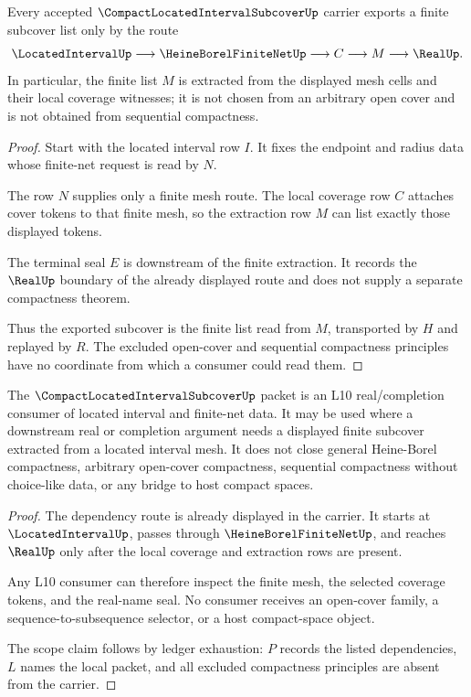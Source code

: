 \begin{theorem}
\label{thm:compact-located-interval-subcover-finite-net-extraction}
Every accepted $\CompactLocatedIntervalSubcoverUp$ carrier exports a finite subcover list only by the route
$$
\LocatedIntervalUp \longrightarrow \HeineBorelFiniteNetUp \longrightarrow C \longrightarrow M \longrightarrow \RealUp .
$$
In particular, the finite list $M$ is extracted from the displayed mesh cells and their local coverage witnesses; it is not chosen from an arbitrary open cover and is not obtained from sequential compactness.
\end{theorem}
\begin{proof}
Start with the located interval row $I$. It fixes the endpoint and radius data whose finite-net request is read by $N$.

The row $N$ supplies only a finite mesh route. The local coverage row $C$ attaches cover tokens to that finite mesh, so the extraction row $M$ can list exactly those displayed tokens.

The terminal seal $E$ is downstream of the finite extraction. It records the $\RealUp$ boundary of the already displayed route and does not supply a separate compactness theorem.

Thus the exported subcover is the finite list read from $M$, transported by $H$ and replayed by $R$. The excluded open-cover and sequential compactness principles have no coordinate from which a consumer could read them.
\end{proof}

\begin{theorem}
\label{thm:compact-located-interval-subcover-l10-scope}
The $\CompactLocatedIntervalSubcoverUp$ packet is an L10 real/completion consumer of located interval and finite-net data. It may be used where a downstream real or completion argument needs a displayed finite subcover extracted from a located interval mesh. It does not close general Heine-Borel compactness, arbitrary open-cover compactness, sequential compactness without choice-like data, or any bridge to host compact spaces.
\end{theorem}
\begin{proof}
The dependency route is already displayed in the carrier. It starts at $\LocatedIntervalUp$, passes through $\HeineBorelFiniteNetUp$, and reaches $\RealUp$ only after the local coverage and extraction rows are present.

Any L10 consumer can therefore inspect the finite mesh, the selected coverage tokens, and the real-name seal. No consumer receives an open-cover family, a sequence-to-subsequence selector, or a host compact-space object.

The scope claim follows by ledger exhaustion: $P$ records the listed dependencies, $L$ names the local packet, and all excluded compactness principles are absent from the carrier.
\end{proof}

